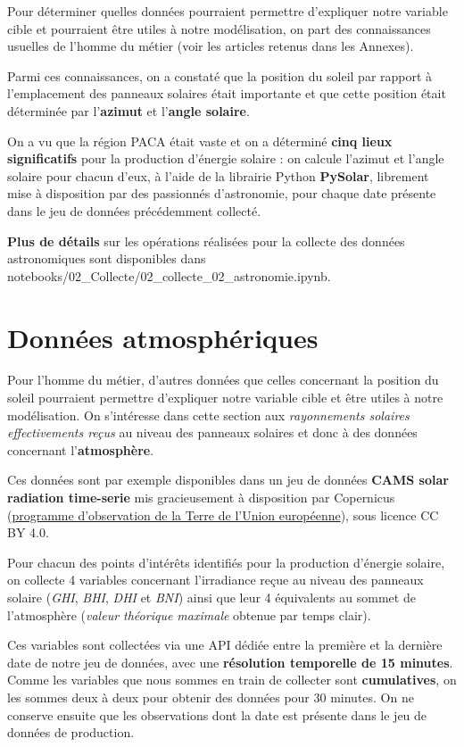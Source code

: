 Pour déterminer quelles données pourraient permettre d'expliquer notre variable cible et pourraient être utiles à notre modélisation, on part des connaissances usuelles de l'homme du métier (voir les articles retenus dans les Annexes).

Parmi ces connaissances, on a constaté que la position du soleil par rapport à l'emplacement des panneaux solaires était importante et que cette position était déterminée par l'\textbf{azimut} et l'\textbf{angle solaire}.

On a vu que la région PACA était vaste et on a déterminé \textbf{cinq lieux significatifs} pour la production d'énergie solaire : on calcule l'azimut et l'angle solaire pour chacun d'eux, à l’aide de la librairie Python \textbf{PySolar}, librement mise à disposition par des passionnés d’astronomie, pour chaque date présente dans le jeu de données précédemment collecté.

\textbf{Plus de détails} sur les opérations réalisées pour la collecte des données astronomiques sont disponibles dans notebooks/02\_Collecte/02\_collecte\_02\_astronomie.ipynb.

\section{Données atmosphériques}

Pour l'homme du métier, d'autres données que celles concernant la position du soleil pourraient permettre d'expliquer notre variable cible et être utiles à notre modélisation. On s’intéresse dans cette section aux \textit{rayonnements solaires effectivements reçus} au niveau des panneaux solaires et donc à des données concernant l'\textbf{atmosphère}.

Ces données sont par exemple disponibles dans un jeu de données \textbf{CAMS solar radiation time-serie} mis gracieusement à disposition par Copernicus (\href{https://www.copernicus.eu/fr}{programme d’observation de la Terre de l’Union européenne}), sous licence CC BY 4.0.

Pour chacun des points d'intérêts identifiés pour la production d'énergie solaire, on collecte 4 variables concernant l’irradiance reçue au niveau des panneaux solaire (\textit{GHI}, \textit{BHI}, \textit{DHI} et \textit{BNI}) ainsi que leur 4 équivalents au sommet de l’atmosphère (\textit{valeur théorique maximale} obtenue par temps clair).

Ces variables sont collectées via une API dédiée entre la première et la dernière date de notre jeu de données, avec une \textbf{résolution temporelle de 15 minutes}. Comme les variables que nous sommes en train de collecter sont \textbf{cumulatives}, on les sommes deux à deux pour obtenir des données pour 30 minutes. On ne conserve ensuite que les observations dont la date est présente dans le jeu de données de production.

